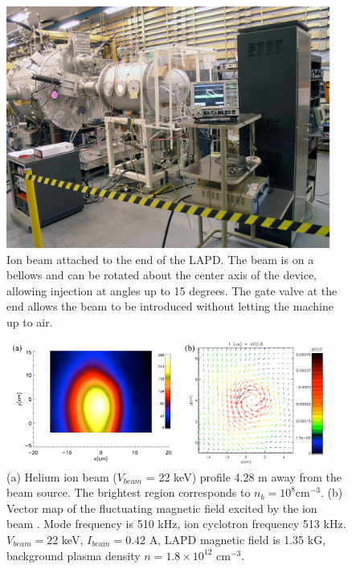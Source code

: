 \documentclass[11pt]{article}
\begin{document}
\begin{figure}[htbp] %
   \centering
   \includegraphics[width=0.95\textwidth]{ionbeamsource.jpg} 
   \caption{Ion beam attached to the end of the LAPD.  The beam is on a bellows and can be rotated about the center axis of the device, allowing injection at angles up to 15 degrees. The gate valve at the end allows the beam to be introduced without letting the machine up to air. }
   \label{fig:ionbeamsource}
\end{figure}
\begin{figure}[htbp] %
   \centering
   \includegraphics[width=0.95\textwidth]{ionbeam_and_wave.jpg} 
   \caption{(a) Helium ion beam ($V_{beam}$ = 22 keV) profile 4.28 m away from the beam source.  The brightest region corresponds to $n_{b} = 10^{8} $cm$^{-3}$. (b) Vector map of the fluctuating magnetic field excited by the ion beam .  Mode frequency is 510 kHz, ion cyclotron frequency 513 kHz.  $V_{beam} = 22$ keV, $I_{beam} = 0.42$ A, LAPD magnetic field is 1.35 kG, background plasma density $n = 1.8 \times 10^{12}$ cm$^{-3}$. }
   \label{fig:ionbeam_and_wave}
\end{figure}
 \pagebreak
\end{document}
